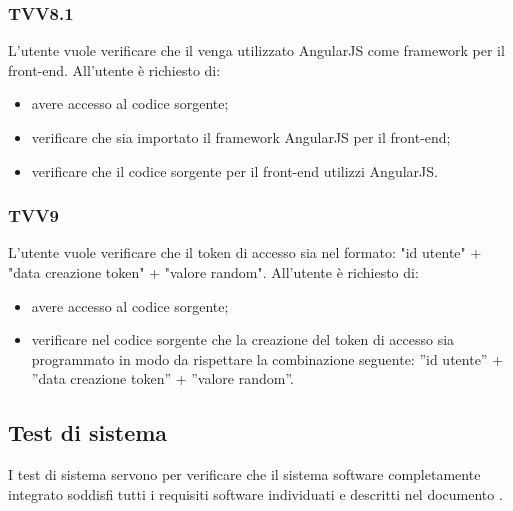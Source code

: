 		\subsubsection{TVV8.1}
			L'utente vuole verificare che il venga utilizzato AngularJS come framework per il front-end. All'utente è richiesto di:
			\begin{itemize}
				\item avere accesso al codice sorgente;
				\item verificare che sia importato il framework AngularJS per il front-end;
				\item verificare che il codice sorgente per il front-end utilizzi AngularJS.
			\end{itemize}
			
		\subsubsection{TVV9}
			L'utente vuole verificare che il token di accesso sia nel formato: "id utente" + "data creazione token" + "valore random". All'utente è richiesto di:
			\begin{itemize}
				\item avere accesso al codice sorgente;
				\item verificare nel codice sorgente che la creazione del token di accesso sia programmato in modo da rispettare la combinazione seguente: ''id utente'' + ''data creazione token'' + ''valore random''.
			\end{itemize}

	\subsection{Test di sistema}
		I test di sistema servono per verificare che il sistema software completamente integrato soddisfi tutti i requisiti software individuati e descritti nel documento \docNameVersionAdR.
